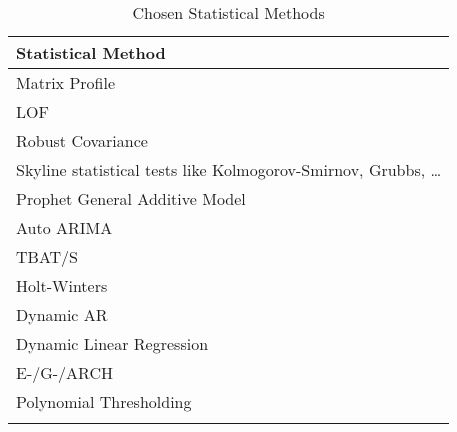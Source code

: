 \begin{table}[h]\centering
        \begin{tabular}{l}
            Statistical Method                                                        \\\midrule                                                                               
            Matrix Profile                                                            \\\addlinespace
            LOF                                                                       \\\addlinespace
            Robust Covariance                                                         \\\addlinespace
            Skyline statistical tests like Kolmogorov-Smirnov, Grubbs, \ldots         \\\addlinespace
            Prophet General Additive Model                                            \\\addlinespace
            Auto ARIMA                                                                \\\addlinespace
            TBAT/S                                                                    \\\addlinespace
            Holt-Winters                                                              \\\addlinespace
            Dynamic AR                                                                \\\addlinespace
            Dynamic Linear Regression                                                 \\\addlinespace
            E-/G-/ARCH                                                                \\\addlinespace
            Polynomial Thresholding                                                   \\\addlinespace
        \end{tabular}
    \caption{Chosen Statistical Methods}\label{tab:chosen-packages}
\end{table}

